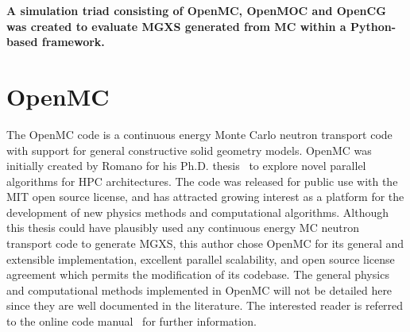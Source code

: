   

\begin{emphbox}
\textbf{A simulation triad consisting of OpenMC, OpenMOC and OpenCG was created to evaluate \ac{MGXS} generated from \ac{MC} within a Python-based framework.}
\end{emphbox}


\section{OpenMC}
\label{sec:chap4-openmc}

The OpenMC code is a continuous energy Monte Carlo neutron transport code~\cite{romano2013openmc} with support for general constructive solid geometry models. OpenMC was initially created by Romano for his Ph.D. thesis~\cite{romano2013parallel} to explore novel parallel algorithms for \ac{HPC} architectures. The code was released for public use with the MIT open source license, and has attracted growing interest as a platform for the development of new physics methods and computational algorithms. Although this thesis could have plausibly used any continuous energy \ac{MC} neutron transport code to generate \ac{MGXS}, this author chose OpenMC for its general and extensible implementation, excellent parallel scalability, and open source license agreement which permits the modification of its codebase. The general physics and computational methods implemented in OpenMC will not be detailed here since they are well documented in the literature. The interested reader is referred to the online code manual~\cite{openmc2016manual} for further information.

